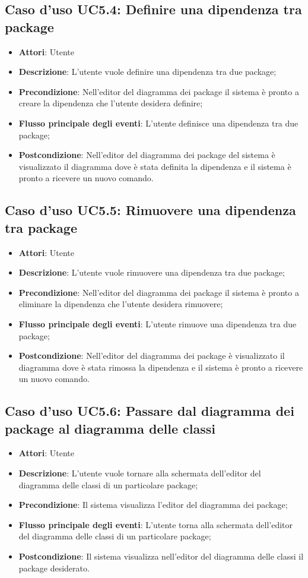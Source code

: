 \documentclass[../AnalisiDeiRequisiti.tex]{subfiles}
\begin{document}
			\subsection{Caso d'uso UC5.4: Definire una dipendenza tra package}
			\begin{itemize}
				\item \textbf{Attori}: Utente
				\item \textbf{Descrizione}: L'utente vuole definire una dipendenza tra due package;
				\item \textbf{Precondizione}: Nell'editor del diagramma dei package il sistema è pronto a creare la dipendenza che l'utente desidera definire;
				\item \textbf{Flusso principale degli eventi}: L'utente definisce una dipendenza tra due package;
				\item \textbf{Postcondizione}: Nell'editor del diagramma dei package del sistema è visualizzato il diagramma dove è stata definita la dipendenza e il sistema è pronto a ricevere un nuovo comando.
			\end{itemize}
			\subsection{Caso d'uso UC5.5: Rimuovere una dipendenza tra package}
			\begin{itemize}
				\item \textbf{Attori}: Utente
				\item \textbf{Descrizione}: L'utente vuole rimuovere una dipendenza tra due package;
				\item \textbf{Precondizione}: Nell'editor del diagramma dei package il sistema è pronto a eliminare la dipendenza che l'utente desidera rimuovere;
				\item \textbf{Flusso principale degli eventi}: L'utente rimuove una dipendenza tra due package;
				\item \textbf{Postcondizione}: Nell'editor del diagramma dei package è visualizzato il diagramma dove è stata rimossa la dipendenza e il sistema è pronto a ricevere un nuovo comando.
			\end{itemize}
			\subsection{Caso d'uso UC5.6: Passare dal diagramma dei package al diagramma delle classi}
			\begin{itemize}
				\item \textbf{Attori}: Utente
				\item \textbf{Descrizione}: L'utente vuole tornare alla schermata dell'editor del diagramma delle classi di un particolare package;
				\item \textbf{Precondizione}: Il sistema visualizza l'editor del diagramma dei package;
				\item \textbf{Flusso principale degli eventi}: L'utente torna alla schermata dell'editor del diagramma delle classi di un particolare package;
				\item \textbf{Postcondizione}: Il sistema visualizza nell'editor del diagramma delle classi il package desiderato.
			\end{itemize}
\end{document}
